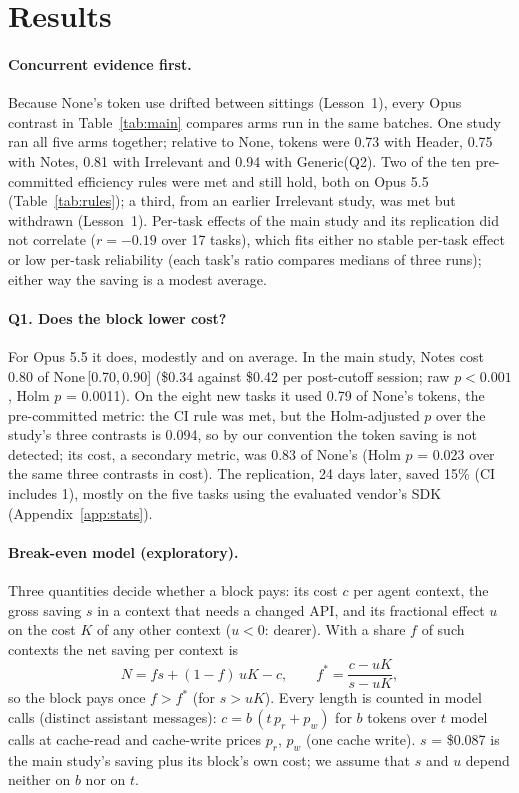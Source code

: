 \documentclass[11pt]{article}
\newcommand{\ci}[2]{\,[#1,\,#2]}
\newcommand{\aNone}{\textsf{None}\xspace}
\newcommand{\aNotes}{\textsf{Notes}\xspace}
\newcommand{\aHeader}{\textsf{Header}\xspace}
\newcommand{\aIrr}{\textsf{Irrelevant}\xspace}
\newcommand{\aGen}{\textsf{Generic}\xspace}
\begin{document}
\section{Results}
\label{sec:results}

\paragraph{Concurrent evidence first.}
Because \aNone's token use drifted between sittings (Lesson~1), every Opus contrast in Table~\ref{tab:main} compares arms run in the same batches.
One study ran all five arms together; relative to \aNone, tokens were 0.73 with \aHeader, 0.75 with \aNotes, 0.81 with \aIrr and 0.94 with \aGen (Q2).
Two of the ten pre-committed efficiency rules were met and still hold, both on Opus 5.5 (Table~\ref{tab:rules}); a third, from an earlier \aIrr study, was met but withdrawn (Lesson~1).
Per-task effects of the main study and its replication did not correlate ($r = -0.19$ over 17 tasks), which fits either no stable per-task effect or low per-task reliability (each task's ratio compares medians of three runs); either way the saving is a modest average.

\paragraph{Q1. Does the block lower cost?}
For Opus 5.5 it does, modestly and on average.
In the main study, \aNotes cost 0.80 of \aNone\ci{0.70}{0.90} (\$0.34 against \$0.42 per post-cutoff session; raw $p<0.001$, Holm $p$ = 0.0011).
On the eight new tasks it used 0.79 of \aNone's tokens, the pre-committed metric: the CI rule was met, but the Holm-adjusted $p$ over the study's three contrasts is 0.094, so by our convention the token saving is not detected; its cost, a secondary metric, was 0.83 of \aNone's (Holm $p$ = 0.023 over the same three contrasts in cost).
The replication, 24 days later, saved 15\% (CI includes 1), mostly on the five tasks using the evaluated vendor's SDK (Appendix~\ref{app:stats}).

\paragraph{Break-even model (exploratory).}
Three quantities decide whether a block pays: its cost $c$ per agent context, the gross saving $s$ in a context that needs a changed API, and its fractional effect $u$ on the cost $K$ of any other context ($u<0$: dearer). With a share $f$ of such contexts the net saving per context is
\begin{equation*}
N = f s + (1-f)\,u K - c, \qquad f^{*} = \frac{c - uK}{s - uK},
\end{equation*}
so the block pays once $f > f^{*}$ (for $s > uK$).
Every length is counted in model calls (distinct assistant messages): $c = b\,(t\,p_r + p_w)$ for $b$ tokens over $t$ model calls at cache-read and cache-write prices $p_r$, $p_w$ (one cache write).
$s$ = \$0.087 is the main study's saving plus its block's own cost; we assume that $s$ and $u$ depend neither on $b$ nor on $t$.
\end{document}
